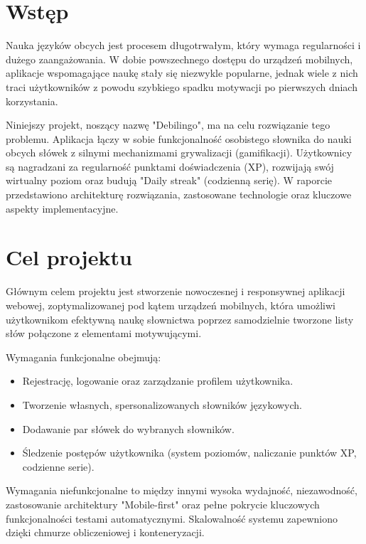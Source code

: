\documentclass[times]{san}
\begin{document}
\maketitlepage
\spistresci

\section{Wstęp}

Nauka języków obcych jest procesem długotrwałym, który wymaga regularności i dużego zaangażowania. W dobie powszechnego dostępu do urządzeń mobilnych, aplikacje wspomagające naukę stały się niezwykle popularne, jednak wiele z nich traci użytkowników z powodu szybkiego spadku motywacji po pierwszych dniach korzystania. 

Niniejszy projekt, noszący nazwę "Debilingo", ma na celu rozwiązanie tego problemu. Aplikacja łączy w sobie funkcjonalność osobistego słownika do nauki obcych słówek z silnymi mechanizmami grywalizacji (gamifikacji). Użytkownicy są nagradzani za regularność punktami doświadczenia (XP), rozwijają swój wirtualny poziom oraz budują "Daily streak" (codzienną serię). W raporcie przedstawiono architekturę rozwiązania, zastosowane technologie oraz kluczowe aspekty implementacyjne.

\section{Cel projektu}

Głównym celem projektu jest stworzenie nowoczesnej i responsywnej aplikacji webowej, zoptymalizowanej pod kątem urządzeń mobilnych, która umożliwi użytkownikom efektywną naukę słownictwa poprzez samodzielnie tworzone listy słów połączone z elementami motywującymi.

Wymagania funkcjonalne obejmują:
\begin{itemize}
    \item Rejestrację, logowanie oraz zarządzanie profilem użytkownika.
    \item Tworzenie własnych, spersonalizowanych słowników językowych.
    \item Dodawanie par słówek do wybranych słowników.
    \item Śledzenie postępów użytkownika (system poziomów, naliczanie punktów XP, codzienne serie).
\end{itemize}

Wymagania niefunkcjonalne to między innymi wysoka wydajność, niezawodność, zastosowanie architektury "Mobile-first" oraz pełne pokrycie kluczowych funkcjonalności testami automatycznymi. Skalowalność systemu zapewniono dzięki chmurze obliczeniowej i konteneryzacji.
\end{document}
